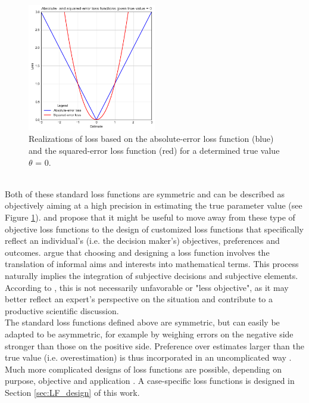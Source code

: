         \begin{figure}[h]
        	\centering
        	\includegraphics[width=0.5\textwidth]{Figures/abs_sqr_det.png}
        	\caption{Realizations of loss based on the absolute-error loss function (blue) and the squared-error loss function (red) for a determined true value $\theta$ = 0.}\label{fig:abs_sqr_det} 
        \end{figure}\\
        Both of these standard loss functions are symmetric and can be described as objectively aiming at a high precision in estimating the true parameter value (see Figure \ref{fig:abs_sqr_det}).
        \citet{davidson2015} and \citet{hennig2007} propose that it might be useful to move away from these type of objective loss functions to the design of customized loss functions that specifically reflect an individual's (i.e. the decision maker's) objectives, preferences and outcomes. \citet{hennig2007} argue that choosing and designing a loss function involves the translation of informal aims and interests into mathematical terms. This process naturally implies the integration of subjective decisions and subjective elements. According to \citet{hennig2007}, this is not necessarily unfavorable or "less objective", as it may better reflect an expert's perspective on the situation and contribute to a productive scientific discussion.\\        
        The standard loss functions defined above are symmetric, but can easily be adapted to be asymmetric, for example by weighing errors on the negative side stronger than those on the positive side. Preference over estimates larger than the true value (i.e. overestimation) is thus incorporated in an uncomplicated way \citep{davidson2015, hennig2007}. Much more complicated designs of loss functions are possible, depending on purpose, objective and application \citep{davidson2015}. A case-specific loss functions is designed in Section \ref{sec:LF_design} of this work.\\
